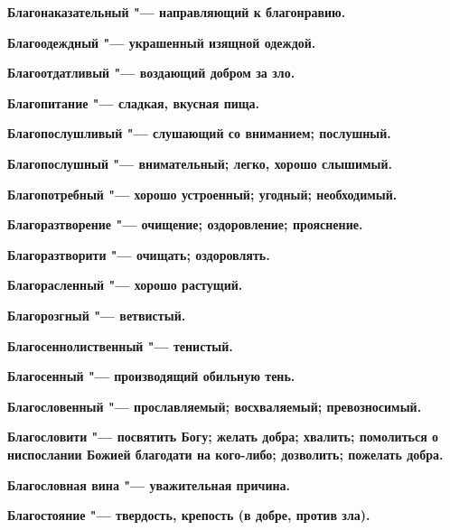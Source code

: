 \begin{multicols}{2}
\bfseries Благонаказательный\normalfont{} "--- направляющий к благонравию. 




\bfseries Благоодеждный\normalfont{} "--- украшенный изящной одеждой. 




\bfseries Благоотдатливый\normalfont{} "--- воздающий добром за зло. 




\bfseries Благопитание\normalfont{} "--- сладкая, вкусная пища. 




\bfseries Благопослушливый\normalfont{} "--- слушающий со вниманием; послушный. 




\bfseries Благопослушный\normalfont{} "--- внимательный; легко, хорошо слышимый. 




\bfseries Благопотребный\normalfont{} "--- хорошо устроенный; угодный; необходимый. 




\bfseries Благоразтворение\normalfont{} "--- очищение; оздоровление; прояснение. 




\bfseries Благоразтворити\normalfont{} "--- очищать; оздоровлять. 




\bfseries Благорасленный\normalfont{} "--- хорошо растущий. 




\bfseries Благорозгный\normalfont{} "--- ветвистый. 




\bfseries Благосеннолиственный\normalfont{} "--- тенистый. 




\bfseries Благосенный\normalfont{} "--- производящий обильную тень. 




\bfseries Благословенный\normalfont{} "--- прославляемый; восхваляемый; превозносимый. 




\bfseries Благословити\normalfont{} "--- посвятить Богу; желать добра; хвалить; помолиться о ниспослании Божией благодати на кого-либо; дозволить; пожелать добра. 




\bfseries Благословная вина\normalfont{} "--- уважительная причина. 




\bfseries Благостояние\normalfont{} "--- твердость, крепость (в добре, против зла). 





\end{multicols}
